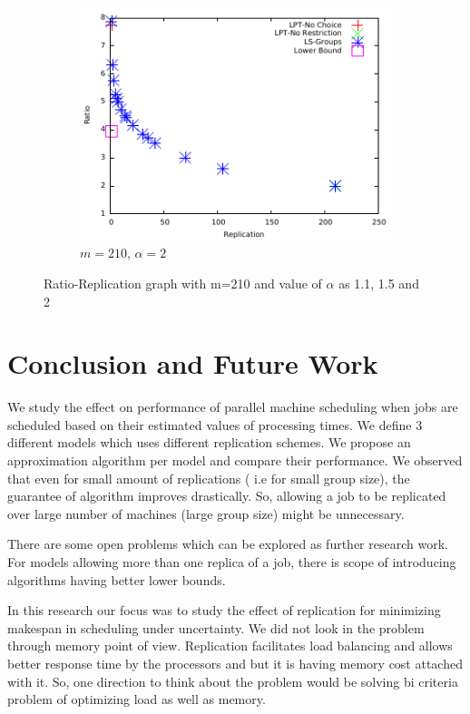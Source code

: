\documentclass[10pt, conference, compsocconf]{IEEEtran}
\begin{document}
\begin {figure}
\begin{subfigure}[b]{0.5\textwidth}
     \includegraphics[width=\textwidth]{alpha_2.pdf}
     \caption{$m=210$, $\alpha=2$}
      \label{fig:3}
\end {subfigure} %


\caption{Ratio-Replication graph with m=210 and value of $\alpha$ as 1.1, 1.5 and 2}
\label{fig:Graph}
\end {figure}

\section{Conclusion and Future Work}

We study the effect on performance of parallel machine scheduling when jobs are scheduled based on their estimated values of processing times.  We define 3 different models which uses different replication schemes.  We propose an  approximation algorithm per model and compare their performance. We observed that even for small amount of replications ( i.e for small group size), the guarantee of algorithm improves drastically. So, allowing a job to be replicated over large number of machines (large group size) might be unnecessary. 

There are some open problems which can be explored as further research work. For models allowing more than one replica of a job, there is scope of introducing algorithms having better lower bounds.

 In this research our focus was to study the effect of replication for minimizing makespan in scheduling under uncertainty. We did not look in the problem through memory point of view. Replication facilitates load balancing and allows better response time by the processors and  but it is having memory cost attached with it. So, one direction to think about the problem would be solving bi criteria problem of optimizing load as well as memory. 
 
\end{document}
